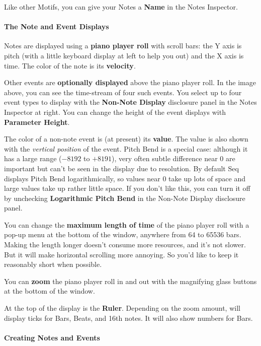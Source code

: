 \documentclass[twoside,10pt]{article}
\begin{document}
Like other Motifs, you can give your Notes a {\bf Name} in the Notes Inspector.  

\paragraph{The Note and Event Displays}

Notes are displayed using a {\bf piano player roll} with scroll bars: the Y axis is pitch (with a little keyboard display at left to help you out) and the X axis is time.  The color of the note is its {\bf velocity}.  

Other events are {\bf optionally displayed} above the piano player roll.  In the image above, you can see the time-stream of four such events. You select up to four event types to display with the {\bf Non-Note Display} disclosure panel in the Notes Inspector at right.  You can change the height of the event displays with {\bf Parameter Height}.

The color of a non-note event is (at present) its {\bf value}.   The value is also shown with the {\it vertical position} of the event.  Pitch Bend is a special case: although it has a large range (\(-8192\) to \(+8191\)), very often subtle difference near 0 are important but can't be seen in the display due to resolution.  By default Seq displays Pitch Bend logarithmically, so values near 0 take up lots of space and large values take up rather little space.  If you don't like this, you can turn it off by unchecking {\bf Logarithmic Pitch Bend} in the Non-Note Display disclosure panel.

 You can change the {\bf maximum length of time} of the piano player roll with a pop-up menu at the bottom of the window, anywhere from 64 to 65536 bars.  Making the length longer doesn't consume more resources, and it's not slower.  But it will make horizontal scrolling more annoying.  So you'd like to keep it reasonably short when possible.

You can {\bf zoom} the piano player roll in and out with the magnifying glass buttons at the bottom of the window.

At the top of the display is the {\bf Ruler}.  Depending on the zoom amount, will display ticks for Bars, Beats, and 16th notes.  It will also show numbers for Bars.

\paragraph{Creating Notes and Events}
\end{document}
